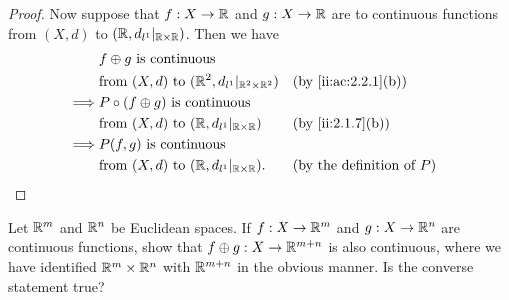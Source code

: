 \begin{proof}
  Now suppose that \(f : X \to \mathbb{R}\) and \(g : X \to \mathbb{R}\) are to continuous functions from \((X, d)\) to \((\mathbb{R}, d_{l^1}|_{\mathbb{R} \times \mathbb{R}})\).
  Then we have
  \begin{align*}
             & f \oplus g \text{ is continuous }                                                                            \\
             & \text{from } (X, d) \text{ to } (\R^2, d_{l^1}|_{\R^2 \times \R^2}) &  & \by{ii:ac:2.2.1}[b]                 \\
    \implies & P \circ (f \oplus g) \text{ is continuous }                                                                  \\
             & \text{from } (X, d) \text{ to } (\R, d_{l^1}|_{\R \times \R})       &  & \by{ii:2.1.7}[b]                    \\
    \implies & P(f, g) \text{ is continuous }                                                                               \\
             & \text{from } (X, d) \text{ to } (\R, d_{l^1}|_{\R \times \R}).      &  & \text{(by the definition of \(P\))}
  \end{align*}
\end{proof}

\begin{ex}\label{ii:ex:2.2.6}
  Let \(\mathbb{R}^m\) and \(\mathbb{R}^n\) be Euclidean spaces.
  If \(f : X \to \mathbb{R}^m\) and \(g : X \to \mathbb{R}^n\) are continuous functions, show that \(f \oplus g : X \to \mathbb{R}^{m + n}\) is also continuous, where we have identified \(\mathbb{R}^m \times \mathbb{R}^n\) with \(\mathbb{R}^{m + n}\) in the obvious manner.
  Is the converse statement true?
\end{ex}

